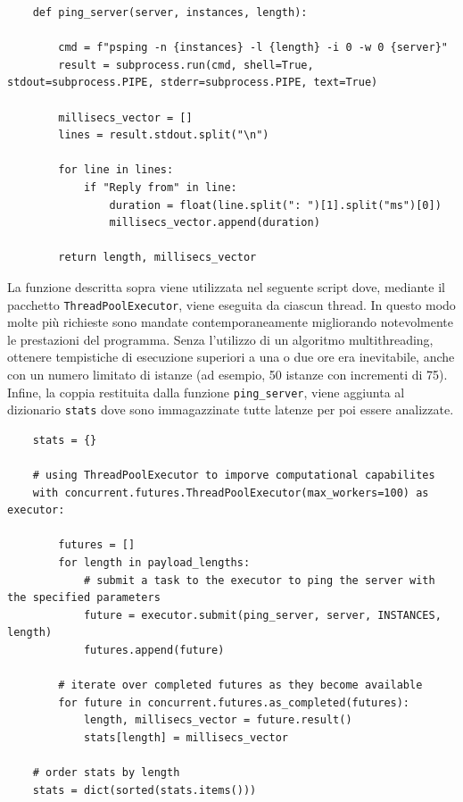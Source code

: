 \begin{lstlisting}
    def ping_server(server, instances, length):

        cmd = f"psping -n {instances} -l {length} -i 0 -w 0 {server}"
        result = subprocess.run(cmd, shell=True, stdout=subprocess.PIPE, stderr=subprocess.PIPE, text=True)

        millisecs_vector = []
        lines = result.stdout.split("\n")
        
        for line in lines:
            if "Reply from" in line:
                duration = float(line.split(": ")[1].split("ms")[0])
                millisecs_vector.append(duration)
        
        return length, millisecs_vector
\end{lstlisting}

\noindent La funzione descritta sopra viene utilizzata nel seguente script dove, mediante il pacchetto \texttt{ThreadPoolExecutor}, viene eseguita da ciascun thread. In questo modo molte più richieste sono mandate contemporaneamente migliorando notevolmente le prestazioni del programma. Senza l'utilizzo di un algoritmo multithreading, ottenere tempistiche di esecuzione superiori a una o due ore era inevitabile, anche con un numero limitato di istanze (ad esempio, 50 istanze con incrementi di 75). Infine, la coppia restituita dalla funzione \texttt{ping\_server}, viene aggiunta al dizionario \texttt{stats} dove sono immagazzinate tutte latenze per poi essere analizzate.

\begin{lstlisting}
    stats = {}
    
    # using ThreadPoolExecutor to imporve computational capabilites
    with concurrent.futures.ThreadPoolExecutor(max_workers=100) as executor:
        
        futures = []
        for length in payload_lengths:
            # submit a task to the executor to ping the server with the specified parameters
            future = executor.submit(ping_server, server, INSTANCES, length)
            futures.append(future)
            
        # iterate over completed futures as they become available
        for future in concurrent.futures.as_completed(futures):
            length, millisecs_vector = future.result()
            stats[length] = millisecs_vector
    
    # order stats by length
    stats = dict(sorted(stats.items()))
\end{lstlisting}

